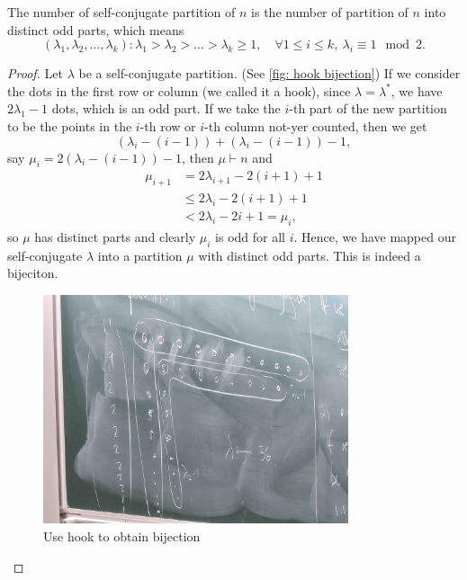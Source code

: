 \begin{proposition}
    The number of self-conjugate partition of \(n\) is the number of partition of \(n\) into distinct odd parts, which means
    \[
        (\lambda _1, \lambda _2, \dots , \lambda _k) : \lambda _1 > \lambda _2 > \dots > \lambda _k \ge 1, \quad \forall 1 \le i \le k, \ \lambda _i \equiv 1 \mod{2}.
    \]  
\end{proposition}
\begin{proof}
    Let \(\lambda \) be a self-conjugate partition. (See \autoref{fig: hook bijection}) If we consider the dots in the first row or column (we called it a hook), since \(\lambda = \lambda ^*\), we have \(2\lambda_1 - 1\) dots, which is an odd part. If we take the \(i\)-th part of the new partition to be the points in the \(i\)-th row or \(i\)-th column not-yer counted, then we get 
    \[
        (\lambda _i - (i - 1)) + (\lambda _i - (i - 1)) - 1,
    \]      say \(\mu _i = 2\left( \lambda _i - (i - 1) \right) - 1 \), then \(\mu \vdash n\) and
    \begin{align*}
        \mu _{i + 1} &= 2 \lambda _{i + 1} - 2(i + 1) + 1 \\
        &\le 2\lambda _i - 2(i + 1) + 1 \\
        &< 2\lambda _i - 2i + 1 = \mu _i,
    \end{align*}  
    so \(\mu \) has distinct parts and clearly \(\mu _i\) is odd for all \(i\). Hence, we have mapped our self-conjugate \(\lambda \) into a partition \(\mu \) with distinct odd parts. This is indeed a bijeciton.  
    \begin{figure}[H]
        \centering
        \includegraphics[width=0.8\textwidth]{./Figures/20250923_161129.jpg}
        \caption{Use hook to obtain bijection}
        \label{fig: hook bijection}
    \end{figure}
    
        
\end{proof}

